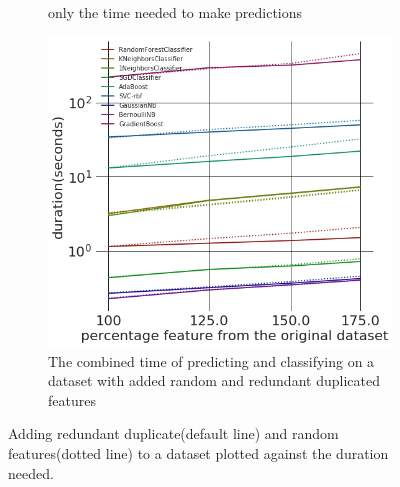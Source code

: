 \documentclass[a4paper,10pt]{article}
\begin{document}
\begin{figure}[H]
\begin{subfigure}[b]{0.45\textwidth}
		\caption{only the time needed to make predictions}
		\label{fig:SADRP}
	\end{subfigure}
\newpage
	\begin{subfigure}[b]{0.65\textwidth}
		\includegraphics[width=\textwidth]{images/scalability/FeatAddDupRand.png}
		\caption{The combined time of predicting and classifying on a dataset with added random and redundant duplicated features}
		\label{fig:SADR}
	\end{subfigure}
	\caption{Adding redundant duplicate(default line) and random features(dotted line) to a dataset plotted against the duration needed.}
	\label{fig:ScalableAdded}
\end{figure}
\end{document}
